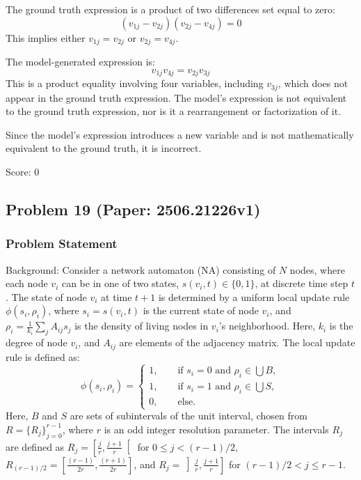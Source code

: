 \documentclass[10pt]{article}
\begin{document}
The ground truth expression is a product of two differences set equal to zero:  
\[
(v_{1j} - v_{2j})(v_{2j} - v_{4j}) = 0
\]  
This implies either \(v_{1j} = v_{2j}\) or \(v_{2j} = v_{4j}\).

The model-generated expression is:  
\[
v_{1j} v_{4j} = v_{2j} v_{3j}
\]  
This is a product equality involving four variables, including \(v_{3j}\), which does not appear in the ground truth expression. The model's expression is not equivalent to the ground truth expression, nor is it a rearrangement or factorization of it.

Since the model's expression introduces a new variable and is not mathematically equivalent to the ground truth, it is incorrect.

Score: 0

\newpage
\subsection*{Problem 19 (Paper: 2506.21226v1)}
\subsubsection*{Problem Statement}
Background:
Consider a network automaton (NA) consisting of $N$ nodes, where each node $v_i$ can be in one of two states, $s(v_i, t) \in \{0, 1\}$, at discrete time step $t$. The state of node $v_i$ at time $t+1$ is determined by a uniform local update rule $\phi(s_i, \rho_i)$, where $s_i = s(v_i, t)$ is the current state of node $v_i$, and $\rho_i = \frac{1}{k_i}\sum_{j}A_{ij}s_j$ is the density of living nodes in $v_i$'s neighborhood. Here, $k_i$ is the degree of node $v_i$, and $A_{ij}$ are elements of the adjacency matrix. The local update rule is defined as:
$$
\phi(s_i, \rho_i) = \begin{cases}
    1, \qquad \text{if } s_i = 0 \text{ and } \rho_i \in \bigcup B,\\
    1, \qquad \text{if } s_i = 1 \text{ and } \rho_i \in \bigcup S,\\
    0, \qquad \text{else}.
\end{cases}
$$
Here, $B$ and $S$ are sets of subintervals of the unit interval, chosen from $R = \{R_j\}_{j=0}^{r-1}$, where $r$ is an odd integer resolution parameter. The intervals $R_j$ are defined as $R_j = \left[\frac{j}{r}, \frac{j+1}{r}\right[$ for $0 \leq j < (r-1)/2$, $R_{(r-1)/2} = \left[\frac{(r-1)}{2r}, \frac{(r+1)}{2r}\right]$, and $R_j = \left]\frac{j}{r}, \frac{j+1}{r}\right]$ for $(r-1)/2 < j \leq r-1$.
\end{document}
